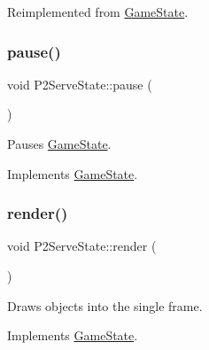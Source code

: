 Reimplemented from \mbox{\hyperlink{class_game_state_af75d6db30190901ed70704d18804fac7}{Game\+State}}.

\mbox{\label{class_p2_serve_state_aa72fcf3306cf089d1efc7122a8147139}} 
\subsubsection{\texorpdfstring{pause()}{pause()}}
{\footnotesize\ttfamily void P2\+Serve\+State\+::pause (\begin{DoxyParamCaption}{ }\end{DoxyParamCaption})\hspace{0.3cm}{\ttfamily [virtual]}}



Pauses \mbox{\hyperlink{class_game_state}{Game\+State}}. 



Implements \mbox{\hyperlink{class_game_state_aafc908582760099891b37bb380ddd87a}{Game\+State}}.

\mbox{\label{class_p2_serve_state_acc6d131c7a5712a643b7f97c3bcdbd46}} 
\subsubsection{\texorpdfstring{render()}{render()}}
{\footnotesize\ttfamily void P2\+Serve\+State\+::render (\begin{DoxyParamCaption}\item[{\mbox{\hyperlink{class_game_engine}{Game\+Engine}} $\ast$}]{ }\end{DoxyParamCaption})\hspace{0.3cm}{\ttfamily [virtual]}}



Draws objects into the single frame. 



Implements \mbox{\hyperlink{class_game_state_a0d56cd5355f59a87cf95e1c6d719f329}{Game\+State}}.

\mbox{\label{class_p2_serve_state_a46b9a456d44c6f22bf5bbdb62e71e490}} 
